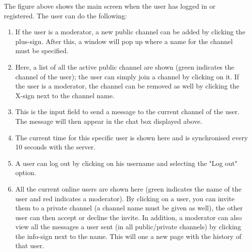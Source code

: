 \documentclass[11pt]{article}
\begin{document}
The figure above shows the main screen when the user has logged in or registered. The user can do the following:

\begin{enumerate}
	\item If the user is a moderator, a new public channel can be added by clicking the plus-sign. After this, a window will pop up where a name for the channel must be specified.
	\item Here, a list of all the active public channel are shown (green indicates the channel of the user); the user can simply join a channel by clicking on it. If the user is a moderator, the channel can be removed as well by clicking the X-sign next to the channel name.
	\item This is the input field to send a message to the current channel of the user. The message will then appear in the chat box displayed above.
	\item The current time for this specific user is shown here and is synchronised every 10 seconds with the server.
	\item A user can log out by clicking on his username and selecting the "Log out" option.
	\item All the current online users are shown here (green indicates the name of the user and red indicates a moderator). By clicking on a user, you can invite them to a private channel (a channel name must be given as well), the other user can then accept or decline the invite. In addition, a moderator can also view all the messages a user sent (in all public/private channels) by clicking the info-sign next to the name. This will one a new page with the history of that user.
\end{enumerate}
\end{document}
